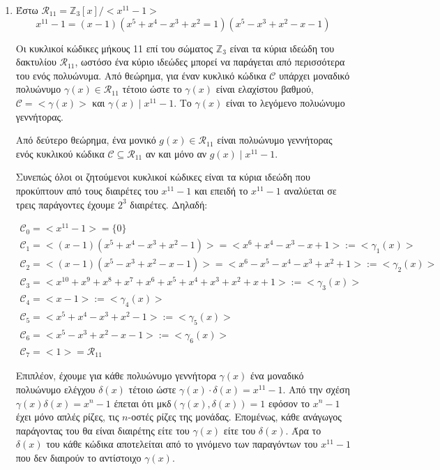 \documentclass[oneside,a4paper]{article}
\newcommand{\Z}{\mathbb{Z}}
\newcommand{\C}{\mathcal{C}}
\newcommand{\R}{\mathcal{R}_{11}}
\begin{document}
\pagebreak

\begin{enumerate}
	\item Έστω $\mathcal{R}_{11} = \Z_3 [x] / <x^{11} - 1 > $
		$$ x^{11} - 1 = (x-1)(x^5 + x^4 -x^3 +x^2 = 1)(x^5 -x^3 + x^2 -x -1)$$

		Οι κυκλικοί κώδικες μήκους 11 επί του σώματος $\Z_3$ είναι τα κύρια ιδεώδη του δακτυλίου $\mathcal{R}_{11}$, ωστόσο ένα κύριο ιδεώδες μπορεί να παράγεται από περισσότερα του ενός πολυώνυμα. Από θεώρημα, για έναν κυκλικό κώδικα $\mathcal{C}$ υπάρχει μοναδικό πολυώνυμο $\gamma (x) \in \R $ τέτοιο ώστε το $\gamma (x) $ είναι ελαχίστου βαθμού, $\C = < \gamma (x) >$ και $ \gamma (x) \mid x^{11} -1$. Το $\gamma (x) $ είναι το λεγόμενο πολυώνυμο γεννήτορας.
		$ $\newline
		
		Από δεύτερο θεώρημα, ένα μονικό $g(x) \in \R$ είναι πολυώνυμο γεννήτορας ενός κυκλικού κώδικα $\C \subseteq \R $ αν και μόνο αν $g(x) \mid x^{11} -1$.
		$ $\newline

		Συνεπώς όλοι οι ζητούμενοι κυκλικοί κώδικες είναι τα κύρια ιδεώδη που προκύπτουν από τους διαιρέτες του $x^{11} - 1$ και επειδή το $x^{11} -1$ αναλύεται σε τρεις παράγοντες έχουμε $2^3$ διαιρέτες. Δηλαδή:

		\begin{gather*}
			\C_0 = < x^{11} -1 > = \{ 0 \} \\
			\C_1 = < (x-1)(x^5+x^4 -x^3 + x^2 -1) > = <x^6 + x^4 -x^3 -x +1 > := <\gamma_1 (x) > \\
			\C_2 = < (x-1)(x^5 -x^3 + x^2 -x -1) > = <x^6 -x^5 -x^4 -x^3 + x^2 + 1 > := < \gamma_2 (x) > \\
			\C_3 = < x^{10} + x^9 + x^8 + x^7 + x^6 + x^5 + x^4 + x^3 + x^2 + x + 1> := < \gamma_3 (x) >\\
			\C_4 = < x-1 > := <\gamma_4 (x) > \\
			\C_5 = < x^5 + x^4 - x^3 + x^2 - 1 > := < \gamma_5 (x) > \\
			\C_6  = < x^5 - x^3 + x^2 -x - 1> := < \gamma_6 (x) > \\
			\C_7 = <1> = \R 
		\end{gather*}
	
		Επιπλέον, έχουμε για κάθε πολυώνυμο γεννήτορα $\gamma (x)$ ένα μοναδικό πολυώνυμο ελέγχου $\delta (x)$ τέτοιο ώστε $\gamma (x) \cdot \delta (x) = x^{11} - 1$. Από την σχέση $\gamma (x) \delta (x) = x^n -1$ έπεται ότι μκδ$(\gamma (x) , \delta (x) ) =1 $ εφόσον το $x^n - 1$ έχει μόνο απλές ρίζες, τις $n$-οστές ρίζες της μονάδας. Επομένως, κάθε ανάγωγος παράγοντας του θα είναι διαιρέτης είτε του $\gamma (x)$ είτε του $\delta (x)$. Άρα το $\delta (x)$ του κάθε κώδικα αποτελείται από το γινόμενο των παραγόντων του $x^{11} - 1$ που δεν διαιρούν το αντίστοιχο $\gamma (x)$.



\end{enumerate}
\end{document}
